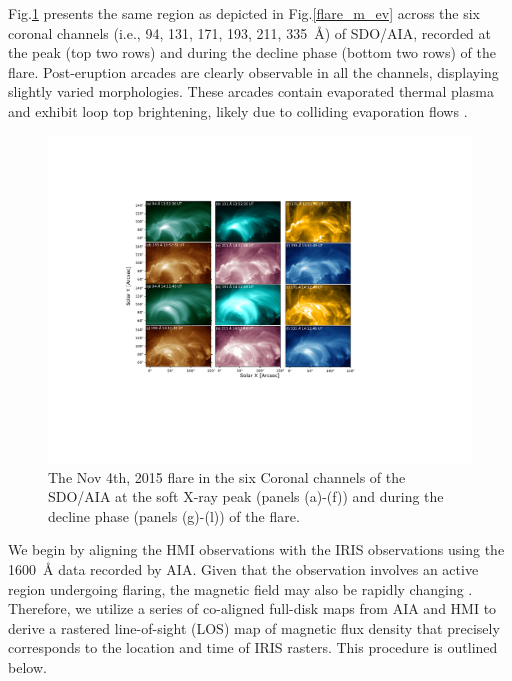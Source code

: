 Fig.\ref{flare_m_aia} presents the same region as depicted in Fig.\ref{flare_m_ev} across the six coronal channels (i.e., 94, 131, 171, 193, 211, 335~{\AA}) of SDO/AIA, recorded at the peak (top two rows) and during the decline phase (bottom two rows) of the flare. Post-eruption arcades \citep[][]{TriBC_2004} are clearly observable in all the channels, displaying slightly varied morphologies. These arcades contain evaporated thermal plasma and exhibit loop top brightening, likely due to colliding evaporation flows \citep[see, e.g.,][]{sharma16, patsourakos04}.

\begin{figure}[ht!]
    \begin{center}
        \includegraphics[trim={4.5cm 5.5cm 6cm 4cm},clip,width=\textwidth]{Figures/nov_flare_aia_waves_2.pdf}
    \end{center}
    \caption{The Nov 4th, 2015 flare in the six Coronal channels of the SDO/AIA at the soft X-ray peak (panels (a)-(f)) and during the decline phase (panels (g)-(l)) of the flare.}
    \label{flare_m_aia}
\end{figure}

We begin by aligning the HMI observations with the IRIS observations using the 1600~{\AA} data recorded by AIA. Given that the observation involves an active region undergoing flaring, the magnetic field may also be rapidly changing \citep{wang02,dandan16,spirock02}. Therefore, we utilize a series of co-aligned full-disk maps from AIA and HMI to derive a rastered line-of-sight (LOS) map of magnetic flux density that precisely corresponds to the location and time of IRIS rasters. This procedure is outlined below.

